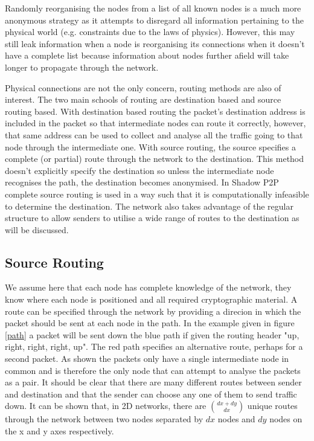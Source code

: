 \documentclass[ %
                    author={Luke Murray},
                supervisor={Dr. Simon Hollis},
                     title={Shadow Peer-to-Peer Networks},
                  subtitle={},
                    degree={MEng},
                      year={2013} ]{thesis}
\begin{document}
Randomly reorganising the nodes from a list of all known nodes is a much more anonymous strategy as it attempts to disregard all information pertaining to the physical world (e.g. constraints due to the laws of physics). However, this may still leak information when a node is reorganising its connections when it doesn't have a complete list because information about nodes further afield will take longer to propagate through the network.

Physical connections are not the only concern, routing methods are also of interest. The two main schools of routing are destination based and source routing based. With destination based routing the packet's destination address is included in the packet so that intermediate nodes can route it correctly, however, that same address can be used to collect and analyse all the traffic going to that node through the intermediate one. With source routing, the source specifies a complete (or partial) route through the network to the destination. This method doesn't explicitly specify the destination so unless the intermediate node recognises the path, the destination becomes anonymised. In Shadow P2P complete source routing is used in a way such that it is computationally infeasible to determine the destination. The network also takes advantage of the regular structure to allow senders to utilise a wide range of routes to the destination as will be discussed.

\subsection{Source Routing}

We assume here that each node has complete knowledge of the network, they know where each node is positioned and all required cryptographic material. A route can be specified through the network by providing a direcion in which the packet should be sent at each node in the path. In the example given in figure \ref{path} a packet will be sent down the blue path if given the routing header "up, right, right, right, up". The red path specifies an alternative route, perhaps for a second packet. As shown the packets only have a single intermediate node in common and is therefore the only node that can attempt to analyse the packets as a pair. It should be clear that there are many different routes between sender and destination and that the sender can choose any one of them to send traffic down. It can be shown that, in 2D networks, there are ${dx + dy \choose dx}$ unique routes through the network between two nodes separated by $dx$ nodes and $dy$ nodes on the x and y axes respectively.
\end{document}
